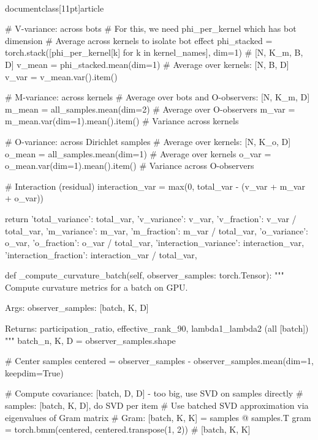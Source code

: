 \\documentclass[11pt]{article}
\begin{document}
\begin{CodeBlock}
{{{{        # V-variance: across bots
        # For this, we need phi_per_kernel which has bot dimension
        # Average across kernels to isolate bot effect
        phi_stacked = torch.stack([phi_per_kernel[k] for k in kernel_names], dim=1)  # [N, K_m, B, D]
        v_mean = phi_stacked.mean(dim=1)  # Average over kernels: [N, B, D]
        v_var = v_mean.var().item()
        
        # M-variance: across kernels
        # Average over bots and O-observers: [N, K_m, D]
        m_mean = all_samples.mean(dim=2)  # Average over O-observers
        m_var = m_mean.var(dim=1).mean().item()  # Variance across kernels
        
        # O-variance: across Dirichlet samples
        # Average over kernels: [N, K_o, D]
        o_mean = all_samples.mean(dim=1)  # Average over kernels
        o_var = o_mean.var(dim=1).mean().item()  # Variance across O-observers
        
        # Interaction (residual)
        interaction_var = max(0, total_var - (v_var + m_var + o_var))
        
        return {
            'total_variance': total_var,
            'v_variance': v_var,
            'v_fraction': v_var / total_var,
            'm_variance': m_var,
            'm_fraction': m_var / total_var,
            'o_variance': o_var,
            'o_fraction': o_var / total_var,
            'interaction_variance': interaction_var,
            'interaction_fraction': interaction_var / total_var,
        }
    
    def _compute_curvature_batch(self, observer_samples: torch.Tensor):
        """
        Compute curvature metrics for a batch on GPU.
        
        Args:
            observer_samples: [batch, K, D]
            
        Returns:
            participation_ratio, effective_rank_90, lambda1_lambda2 (all [batch])
        """
        batch_n, K, D = observer_samples.shape
        
        # Center samples
        centered = observer_samples - observer_samples.mean(dim=1, keepdim=True)
        
        # Compute covariance: [batch, D, D] - too big, use SVD on samples directly
        # samples: [batch, K, D], do SVD per item
        # Use batched SVD approximation via eigenvalues of Gram matrix
        # Gram: [batch, K, K] = samples @ samples.T
        gram = torch.bmm(centered, centered.transpose(1, 2))  # [batch, K, K]
        
}}}}
\end{CodeBlock}
\end{document}
